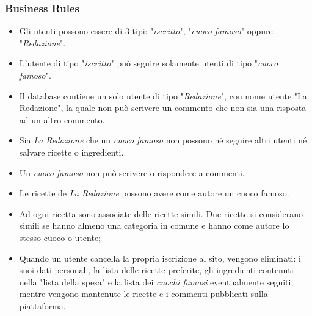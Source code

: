 \documentclass[12pt]{extarticle}
\begin{document}
\subsubsection{Business Rules}
\begin{itemize}
    \item Gli utenti possono essere di 3 tipi: "\textit{iscritto}", "\textit{cuoco famoso}" oppure "\textit{Redazione}".
    \item L'utente di tipo "\textit{iscritto}" può seguire solamente utenti di tipo "\textit{cuoco famoso}".
    \item Il database contiene un solo utente di tipo "\textit{Redazione}", con nome utente "La
    Redazione", la quale non può scrivere un commento che non sia una risposta ad
    un altro commento.
    \item Sia \textit{La Redazione} che un \textit{cuoco famoso} non possono né seguire altri utenti né
    salvare ricette o ingredienti.
    \item Un \textit{cuoco famoso} non può scrivere o rispondere a commenti.
    \item Le ricette de \textit{La Redazione} possono avere come autore un cuoco famoso.
    \item Ad ogni ricetta sono associate delle ricette simili. Due ricette si considerano simili se
    hanno almeno una categoria in comune e hanno come autore lo stesso cuoco o utente;
    \item Quando un utente cancella la propria iscrizione al sito, vengono eliminati: i suoi dati
    personali, la lista delle ricette preferite, gli ingredienti contenuti nella "lista della
    spesa" e la lista dei \textit{cuochi famosi} eventualmente seguiti; mentre vengono mantenute le
    ricette e i commenti pubblicati sulla piattaforma.
\end{itemize}

\newpage
\end{document}

